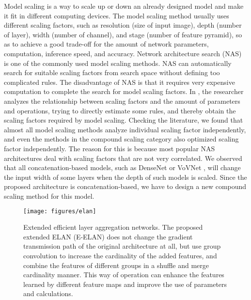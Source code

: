 \documentclass[10pt,twocolumn,letterpaper]{article}
\begin{document}
		Model scaling \cite{tan2019efficientnet, radosavovic2020designing, tan2020efficientdet, tan2021efficientnetv2, dollar2021fast, du2021simple, bello2021revisiting, liu2022swin} is a way to scale up or down an already designed model and make it fit in different computing devices. The model scaling method usually uses different scaling factors, such as resolution (size of input image), depth (number of layer), width (number of channel), and stage (number of feature pyramid), so as to achieve a good trade-off for the amount of network parameters, computation, inference speed, and accuracy. Network architecture search (NAS) is one of the commonly used model scaling methods. NAS can automatically search for suitable scaling factors from search space without defining too complicated rules. The disadvantage of NAS is that it requires very expensive computation to complete the search for model scaling factors. In \cite{dollar2021fast}, the researcher analyzes the relationship between scaling factors and the amount of parameters and operations, trying to directly estimate some rules, and thereby obtain the scaling factors required by model scaling. Checking the literature, we found that almost all model scaling methods analyze individual scaling factor independently, and even the methods in the compound scaling category also optimized scaling factor independently. The reason for this is because most popular NAS architectures deal with scaling factors that are not very correlated. We observed that all concatenation-based models, such as DenseNet \cite{huang2017densely} or VoVNet \cite{lee2019energy}, will change the input width of some layers when the depth of such models is scaled. Since the proposed architecture is concatenation-based, we have to design a new compound scaling method for this model.
		
		\begin{figure*}[t]
			\begin{center}
				\texttt{[image: figures/elan]}
			\end{center}
			\caption{Extended efficient layer aggregation networks.  The proposed extended ELAN (E-ELAN) does not change the gradient transmission path of the original architecture at all, but use group convolution to increase the cardinality of the added features, and combine the features of different groups in a shuffle and merge cardinality manner.  This way of operation can enhance the features learned by different feature maps and improve the use of parameters and calculations.}
			\label{fig:elan}
			\vspace{-2mm}
		\end{figure*}
		
\end{document}
